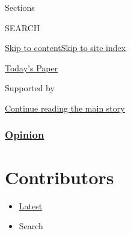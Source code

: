 Sections

SEARCH

\protect\hyperlink{site-content}{Skip to
content}\protect\hyperlink{site-index}{Skip to site index}

\href{https://myaccount.nytimes.com/auth/login?response_type=cookie\&client_id=vi}{}

\href{https://www.nytimes.com/section/todayspaper}{Today's Paper}

Supported by

\protect\hyperlink{after-sponsor}{Continue reading the main story}

\hypertarget{opinion}{%
\subsubsection{\texorpdfstring{\href{/section/opinion}{Opinion}}{Opinion}}\label{opinion}}

\hypertarget{contributors}{%
\section{Contributors}\label{contributors}}

\begin{itemize}
\tightlist
\item
  \protect\hyperlink{stream-panel}{Latest}
\item
  Search
\end{itemize}

